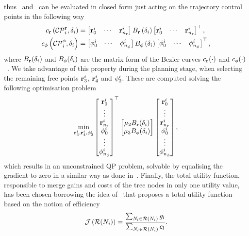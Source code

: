 thus~ and~ can be evaluated in closed form just acting on
the trajectory control points in the following way
\begin{align*}
    c_{\mathbf{r}} \left( \mathcal{CP}^{\mathbf{r}}_i, \delta_i \right) & =
	\begin{bmatrix}
		\mathbf{r}^i_0 & \cdots & \mathbf{r}^i_{n_{\mathbf{r}}}
	\end{bmatrix}
	B_{\mathbf{r}} \left( \delta_{i} \right)
	\begin{bmatrix}
		\mathbf{r}^i_0 & \cdots & \mathbf{r}^i_{n_{\mathbf{r}}}
	\end{bmatrix}^{\top}, \\
	c_{\phi} \left( \mathcal{CP}^{\phi}_i, \delta_i \right) & =
	\begin{bmatrix}
		\phi^i_0 & \cdots & \phi^i_{n_{\phi}}
	\end{bmatrix}
	B_{\phi} \left(\delta_i \right)
	\begin{bmatrix}
		\phi^i_0 & \cdots & \phi^i_{n_{\phi}}
	\end{bmatrix}^{\top},
\end{align*}
where $B_{\mathbf{r}}(\delta_{i})$ and $B_{\phi}(\delta_{i})$ are the matrix form of the B\acuteacc ezier curves
$c_{\mathbf{r}}(\cdot)$ and $c_{\phi}(\cdot)$~\cite{qin2000general}. We take advantage of this property during the planning stage,
when selecting the remaining free points $\mathbf{r}_3^i$, $\mathbf{r}_4^i$ and $\phi_2^i$. These are computed solving the following optimisation problem
\begin{equation*}
	\min_{\mathbf{r}^i_3, \mathbf{r}^i_4, \phi^i_2} 
	\begin{bmatrix}
		\mathbf{r}^i_0 \\ \vdots \\ \mathbf{r}^i_{n_{\mathbf{r}}} \\ \phi^i_0 \\ \vdots \\ \phi^i_{n_{\phi}}
	\end{bmatrix}^{\top}
	\begin{bmatrix}
		\mu_2 B_{\mathbf{r}}(\delta_{i}) \\
		\mu_3 B_{\phi}(\delta_i)
	\end{bmatrix}
	\begin{bmatrix}
		\mathbf{r}^i_0 \\ \vdots \\ \mathbf{r}^i_{n_{\mathbf{r}}} \\ \phi^i_0 \\ \vdots \\ \phi^i_{n_{\phi}}
	\end{bmatrix},
\end{equation*}
which results in an unconstrained QP problem, solvable by equalising the gradient to zero in a similar way as done in~\cite{richter2016polynomial}.
Finally, the total utility function, responsible to merge gains and costs of the tree nodes in only one utility value, has been chosen 
borrowing the idea of~\cite{schmid2020efficient} that proposes a total utility function based on the notion of efficiency
\begin{equation*}
	\mathcal{J} \left( \mathcal{R}(N_i) \right) = \frac{\sum_{N_l \in \mathcal{R} \left( N_i \right)} g_l}{\sum_{N_l \in \mathcal{R} \left( N_i \right)} c_l}.
\end{equation*}

